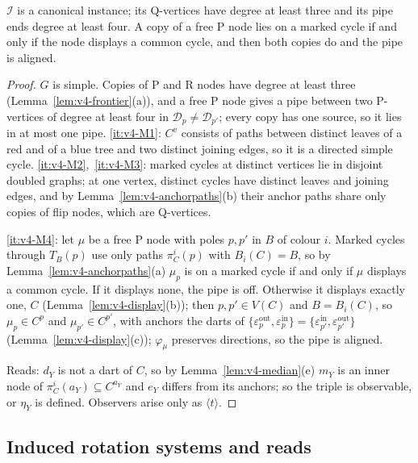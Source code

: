 \begin{lemma}[legality]\label{lem:v4-legal}
$\mathcal I$ is a canonical instance; its Q-vertices have degree at least
three and its pipe ends degree at least four. A copy of a free P node lies on
a marked cycle if and only if the node displays a common cycle, and then both
copies do and the pipe is aligned.
\end{lemma}

\begin{proof}
$G$ is simple. Copies of P and R nodes have degree at least three
(Lemma~\ref{lem:v4-frontier}(a)), and a free P node gives a pipe between two
P-vertices of degree at least four in $\mathcal D_p\ne\mathcal D_{p'}$; every
copy has one source, so it lies in at most one pipe. \ref{it:v4-M1}: $C^v$
consists of paths between distinct leaves of a red and of a blue tree and two
distinct joining edges, so it is a directed simple cycle. \ref{it:v4-M2},~\ref{it:v4-M3}: marked cycles at
distinct vertices lie in disjoint doubled graphs; at one vertex, distinct
cycles have distinct leaves and joining edges, and by
Lemma~\ref{lem:v4-anchorpaths}(b) their anchor paths share only copies of
flip nodes, which are Q-vertices.

\ref{it:v4-M4}: let $\mu$ be a free P node with poles $p,p'$ in $B$ of colour
$i$. Marked cycles through $T_B(p)$ use only paths $\pi^i_C(p)$ with
$B_i(C)=B$, so by Lemma~\ref{lem:v4-anchorpaths}(a) $\mu_p$ is on a marked
cycle if and only if $\mu$ displays a common cycle. If it displays none, the
pipe is off. Otherwise it displays exactly one, $C$
(Lemma~\ref{lem:v4-display}(b)); then $p,p'\in V(C)$ and $B=B_i(C)$, so
$\mu_p\in C^p$ and $\mu_{p'}\in C^{p'}$, with anchors the darts of
$\{\varepsilon^{\mathrm{out}}_p,\varepsilon^{\mathrm{in}}_p\}=
\{\varepsilon^{\mathrm{in}}_{p'},\varepsilon^{\mathrm{out}}_{p'}\}$
(Lemma~\ref{lem:v4-display}(c)); $\varphi_\mu$ preserves directions, so the
pipe is aligned.

Reads: $d_Y$ is not a dart of $C$, so by Lemma~\ref{lem:v4-median}(e) $m_Y$ is
an inner node of $\pi^i_C(a_Y)\subseteq C^{a_Y}$ and $e_Y$ differs from its
anchors; so the triple is observable, or $\eta_Y$ is defined. Observers arise
only as $\langle t\rangle$.
\end{proof}

\subsection{Induced rotation systems and reads}\label{sec:v4-cmp-induced}

